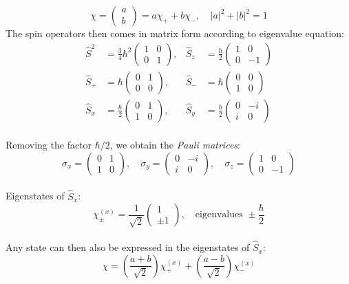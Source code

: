 \[
    \chi = \begin{pmatrix} a \\ b \end{pmatrix} = a\chi_+ + b\chi_-, \quad |a|^2 + |b|^2 = 1
\]
The spin operators then comes in matrix form according to eigenvalue equation:
\[\begin{aligned}
    \hat{S}^2 &= \frac{3}{4}\hbar^2\begin{pmatrix} 1 & 0 \\ 0 & 1 \end{pmatrix}, &
    \hat{S}_z &= \frac{\hbar}{2}\begin{pmatrix} 1 & 0 \\ 0 & -1 \end{pmatrix} \\
    \hat{S}_+ &= \hbar\begin{pmatrix} 0 & 1 \\ 0 & 0 \end{pmatrix}, &
    \hat{S}_- &= \hbar\begin{pmatrix} 0 & 0 \\ 1 & 0 \end{pmatrix} \\
    \hat{S}_x &= \frac{\hbar}{2}\begin{pmatrix} 0 & 1 \\ 1 & 0 \end{pmatrix}, &
    \hat{S}_y &= \frac{\hbar}{2}\begin{pmatrix} 0 & -i \\ i & 0 \end{pmatrix}
\end{aligned}\]\\
Removing the factor $\hbar/2$, we obtain the \emph{Pauli matrices}:
\[
    \sigma_x = \begin{pmatrix} 0 & 1 \\ 1 & 0 \end{pmatrix}, \quad
    \sigma_y = \begin{pmatrix} 0 & -i \\ i & 0 \end{pmatrix}, \quad
    \sigma_z = \begin{pmatrix} 1 & 0 \\ 0 & -1 \end{pmatrix}
\]\\
Eigenstates of $\hat{S}_x$:
\[
    \chi_{\pm}^{(x)} = \frac{1}{\sqrt{2}}\begin{pmatrix} 1 \\ \pm 1 \end{pmatrix}, \quad \text{eigenvalues } \pm\frac{\hbar}{2}
\]\\
Any state can then also be expressed in the eigenstates of $\hat{S}_x$:
\[
    \chi = \left(\frac{a+b}{\sqrt{2}}\right)\chi_+^{(x)} + \left(\frac{a-b}{\sqrt{2}}\right)\chi_-^{(x)}
\]

